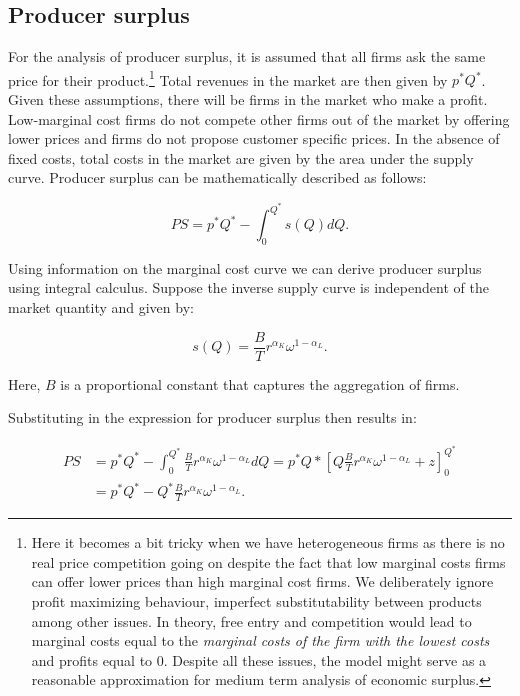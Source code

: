 \documentclass[
]{book}
\begin{document}
\hypertarget{producer-surplus}{%
\subsection{Producer surplus}\label{producer-surplus}}

For the analysis of producer surplus, it is assumed that all firms ask the same price for their product.\footnote{Here it becomes a bit tricky when we have heterogeneous firms as there is no real price competition going on despite the fact that low marginal costs firms can offer lower prices than high marginal cost firms. We deliberately ignore profit maximizing behaviour, imperfect substitutability between products among other issues. In theory, free entry and competition would lead to marginal costs equal to the \emph{marginal costs of the firm with the lowest costs} and profits equal to 0. Despite all these issues, the model might serve as a reasonable approximation for medium term analysis of economic surplus.} Total revenues in the market are then given by \(p^\ast Q^\ast\). Given these assumptions, there will be firms in the market who make a profit. Low-marginal cost firms do not compete other firms out of the market by offering lower prices and firms do not propose customer specific prices. In the absence of fixed costs, total costs in the market are given by the area under the supply curve. Producer surplus can be mathematically described as follows:

\begin{equation}
PS  = p^\ast Q^\ast - \int_0^{Q^\ast} s(Q)dQ.
\end{equation}

Using information on the marginal cost curve we can derive producer surplus using integral calculus. Suppose the inverse supply curve is independent of the market quantity and given by:

\begin{equation}
s(Q) = \frac{B}{T}r^{\alpha_K}\omega^{1-\alpha_L}.
\end{equation}

Here, \(B\) is a proportional constant that captures the aggregation of firms.

Substituting in the expression for producer surplus then results in:

\begin{align}
PS  &= p^\ast Q^\ast - \int_0^{Q^\ast} \frac{B}{T}r^{\alpha_K}\omega^{1-\alpha_L} dQ =  p^\ast Q\ast \left[Q \frac{B}{T}r^{\alpha_K}\omega^{1-\alpha_L} + z\right]^{Q^\ast}_0 \\
&= p^\ast Q^\ast - Q^\ast \frac{B}{T}r^{\alpha_K}\omega^{1-\alpha_L}.
\end{align}
\end{document}

